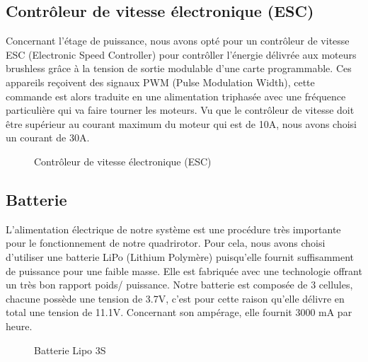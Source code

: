 	\subsection{Contrôleur de vitesse électronique (ESC)}
	Concernant l'étage de puissance, nous avons opté pour un contrôleur de vitesse ESC (Electronic Speed Controller) pour contrôller l'énergie délivrée aux moteurs brushless  grâce à la tension de sortie modulable d’une carte programmable. Ces appareils reçoivent des signaux PWM (Pulse Modulation Width)\cite{altidrone}, cette commande est alors traduite en une alimentation triphasée avec une fréquence particulière qui va faire tourner les moteurs. Vu que le contrôleur de vitesse doit être supérieur au courant maximum du moteur qui est de 10A, nous avons choisi un courant de 30A. 
	\begin{figure} [H]
		\begin{center}
			\centering
		\end{center}
		\caption{Contrôleur de vitesse électronique (ESC)}
	\end{figure}

	\subsection{Batterie}
	L'alimentation électrique de notre système est une procédure très importante pour le fonctionnement de notre quadrirotor. Pour cela, nous avons choisi d'utiliser une batterie LiPo (Lithium Polymère) puisqu'elle fournit suffisamment de puissance pour une faible masse. Elle est fabriquée avec une technologie offrant un très bon rapport poids/ puissance\cite{encyclopedie}. Notre batterie est composée de 3 cellules, chacune possède une tension de 3.7V, c'est pour cette raison qu'elle délivre en total une tension de 11.1V. Concernant son ampérage, elle fournit 3000 mA par heure.
	\par
	\begin{figure} [H]
		\begin{center}
			\centering
		\end{center}
		\caption{Batterie Lipo 3S}
	\end{figure}

